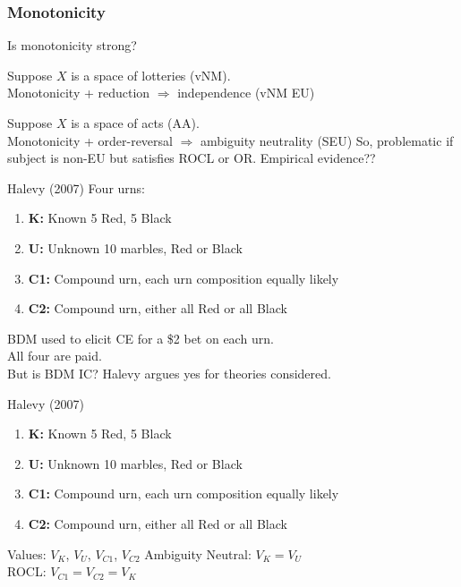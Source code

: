 %
%
%
%
%

\begin{frame}
  \frametitle{Monotonicity}
  Is monotonicity strong?

  \bigskip

  Suppose $X$ is a space of lotteries (vNM).\\
  Monotonicity + reduction $\Rightarrow$ independence (vNM EU)

  \bigskip

  Suppose $X$ is a space of acts (AA).\\
  Monotonicity + order-reversal $\Rightarrow$ ambiguity neutrality (SEU)
  \br
  So, problematic if subject is non-EU but satisfies ROCL or OR.
  \br
  Empirical evidence??
\end{frame}

\begin{frame}{Halevy (2007)}
    Four urns:
    \begin{enumerate}
        \item \textbf{K:} Known 5 Red, 5 Black
        \item \textbf{U:} Unknown 10 marbles, Red or Black
        \item \textbf{C1:} Compound urn, each urn composition equally likely
        \item \textbf{C2:} Compound urn, either all Red or all Black
    \end{enumerate}
    BDM used to elicit CE for a \$2 bet on each urn.\\
    All four are paid.\\
    But is BDM IC? Halevy argues yes for theories considered.
\end{frame}

\begin{frame}{Halevy (2007)}
    \begin{enumerate}
        \item \textbf{K:} Known 5 Red, 5 Black
        \item \textbf{U:} Unknown 10 marbles, Red or Black
        \item \textbf{C1:} Compound urn, each urn composition equally likely
        \item \textbf{C2:} Compound urn, either all Red or all Black
    \end{enumerate}
    Values: $V_K$, $V_U$, $V_{C1}$, $V_{C2}$
    \br
    Ambiguity Neutral: $V_K=V_U$\\
    ROCL: $V_{C1}=V_{C2}=V_K$
\end{frame}

